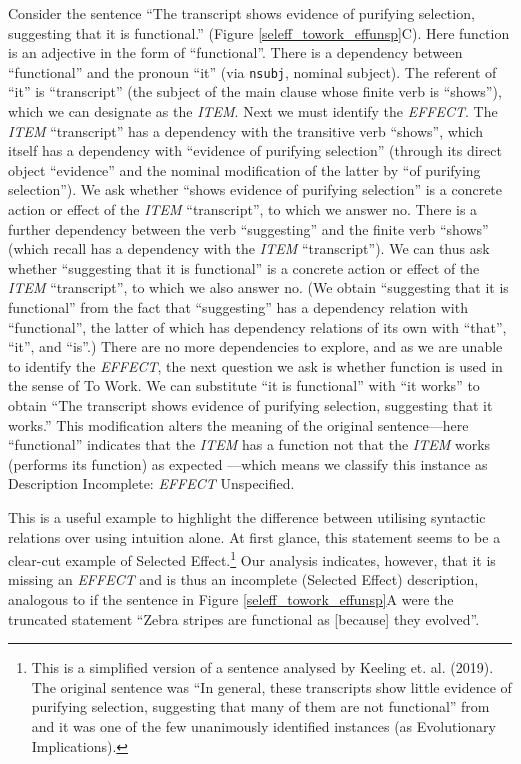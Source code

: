 \documentclass{article}
\begin{document}
Consider the sentence ``The transcript shows evidence of purifying selection, suggesting that it is functional.'' (Figure \ref{seleff_towork_effunsp}C).
Here function is an adjective in the form of ``functional''.
There is a dependency between ``functional'' and the pronoun ``it'' (via \texttt{nsubj}, nominal subject).
The referent of ``it'' is ``transcript'' (the subject of the main clause whose finite verb is ``shows''), which we can designate as the \emph{ITEM}.
Next we must identify the \emph{EFFECT}.
The \emph{ITEM} ``transcript'' has a dependency with the transitive verb ``shows'', which itself has a dependency with ``evidence of purifying selection'' (through its direct object ``evidence'' and the nominal modification of the latter by ``of purifying selection'').
We ask whether ``shows evidence of purifying selection'' is a concrete action or effect of the \emph{ITEM} ``transcript'', to which we answer no.
There is a further dependency between the verb ``suggesting'' and the finite verb ``shows'' (which recall has a dependency with the \emph{ITEM} ``transcript'').
We can thus ask whether ``suggesting that it is functional'' is a concrete action or effect of the \emph{ITEM} ``transcript'', to which we also answer no.
(We obtain ``suggesting that it is functional'' from the fact that ``suggesting'' has a dependency relation with ``functional'', the latter of which has dependency relations of its own with ``that'', ``it'', and ``is''.)
There are no more dependencies to explore, and as we are unable to identify the \emph{EFFECT}, the next question we ask is whether function is used in the sense of To Work.
We can substitute ``it is functional'' with ``it works'' to obtain ``The transcript shows evidence of purifying selection, suggesting that it works.''
This modification alters the meaning of the original sentence---here ``functional'' indicates that the \emph{ITEM} has a function not that the \emph{ITEM} works (performs its function) as expected ---which means we classify this instance as Description Incomplete: \emph{EFFECT} Unspecified.

This is a useful example to highlight the difference between utilising syntactic relations over using intuition alone.
At first glance, this statement seems to be a clear-cut example of Selected Effect.\footnote{This is a simplified version of a sentence analysed by Keeling et. al. (2019). The original sentence was ``In general, these transcripts show little evidence of purifying selection, suggesting that many of them are not functional'' from \cite{Ruiz-Orera_PlosGenetics_2015} and it was one of the few unanimously identified instances (as Evolutionary Implications).}
Our analysis indicates, however, that it is missing an \emph{EFFECT} and is thus an incomplete (Selected Effect) description, analogous to if the sentence in Figure \ref{seleff_towork_effunsp}A were the truncated statement ``Zebra stripes are functional as [because] they evolved''.
\end{document}
